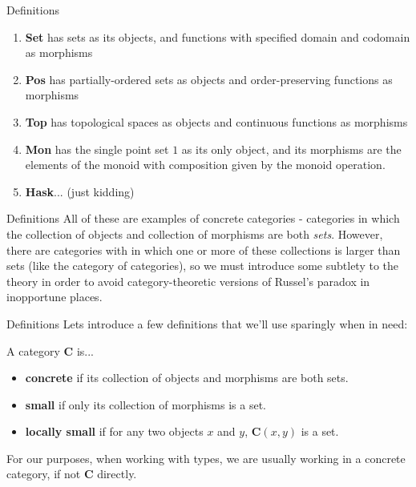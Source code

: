 \documentclass[tikz]{beamer}
\theoremstyle{definition}
\begin{document}
\begin{frame}{Definitions}
\begin{enumerate}[i]
    \item \textbf{Set} has sets as its objects, and functions with specified domain and codomain as morphisms
    \item \textbf{Pos} has partially-ordered sets as objects and order-preserving functions as morphisms
    \item \textbf{Top} has topological spaces as objects and continuous functions as morphisms
    \item \textbf{Mon} has the single point set $1$ as its only object, and its morphisms are the elements of the monoid with composition given by the monoid operation.
    \item \textbf{Hask}... (just kidding)
\end{enumerate}{}
\end{frame}
\begin{frame}{Definitions}
    All of these are examples of concrete categories - categories in which the collection of objects and collection of morphisms are both \textit{sets}. However, there are categories with in which one or more of these collections is larger than sets (like the category of categories), so we must introduce some subtlety to the theory in order to avoid category-theoretic versions of Russel's paradox in inopportune places. 
\end{frame}{}
\begin{frame}{Definitions}
    Lets introduce a few definitions that we'll use sparingly when in need:
    
\begin{definition}

A category $\mathbf{C}$ is...
\begin{itemize}
    \item \textbf{concrete} if its collection of objects and morphisms are both sets.
    \item  \textbf{small} if only its collection of morphisms is a set.
    \item \textbf{locally small} if for any two objects $x$ and $y$, $\mathbf{C}(x, y)$  is a set.
\end{itemize}{}
\end{definition}

For our purposes, when working with types, we are usually working in a concrete category, if not $\mathbf{C}$ directly. 
\end{frame}
 
\end{document}
